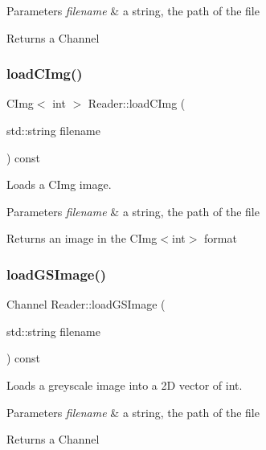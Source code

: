 \begin{DoxyParams}{Parameters}
{\em filename} & a string, the path of the file \\
\hline
\end{DoxyParams}
\begin{DoxyReturn}{Returns}
a Channel 
\end{DoxyReturn}
\mbox{\label{class_reader_a221d27e101af9d6a72f83099004f3aec}} 
\subsubsection{\texorpdfstring{load\+C\+Img()}{loadCImg()}}
{\footnotesize\ttfamily C\+Img$<$ int $>$ Reader\+::load\+C\+Img (\begin{DoxyParamCaption}\item[{std\+::string}]{filename }\end{DoxyParamCaption}) const}



Loads a C\+Img image. 


\begin{DoxyParams}{Parameters}
{\em filename} & a string, the path of the file \\
\hline
\end{DoxyParams}
\begin{DoxyReturn}{Returns}
an image in the C\+Img$<$int$>$ format 
\end{DoxyReturn}
\mbox{\label{class_reader_abe384ab426fbb3ab2345537072771b5f}} 
\subsubsection{\texorpdfstring{load\+G\+S\+Image()}{loadGSImage()}}
{\footnotesize\ttfamily Channel Reader\+::load\+G\+S\+Image (\begin{DoxyParamCaption}\item[{std\+::string}]{filename }\end{DoxyParamCaption}) const}



Loads a greyscale image into a 2D vector of int. 


\begin{DoxyParams}{Parameters}
{\em filename} & a string, the path of the file \\
\hline
\end{DoxyParams}
\begin{DoxyReturn}{Returns}
a Channel 
\end{DoxyReturn}
\mbox{\label{class_reader_a107ec6bb4a34d2a865f9f27ea7768f15}} 
